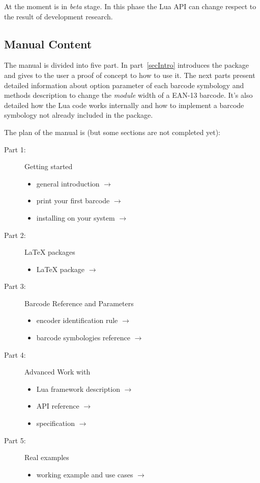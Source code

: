 \documentclass[11pt,a4paper]{article}
\begin{document}
At the moment \brcd{} is in \emph{beta} stage. In this phase the Lua API can
change respect to the result of development research.


\subsection{Manual Content}

The manual is divided into five part. In part~\ref{secIntro} introduces the
package and gives to the user a proof of concept to how to use it. The next
parts present detailed information about option parameter of each barcode
symbology and methods description to change the \emph{module} width of a EAN-13
barcode. It's also detailed how the Lua code works internally and how to
implement a barcode symbology not already included in the package.

The plan of the manual is (but some sections are not completed yet):
\begin{description}
\item[Part 1:] Getting started
\begin{itemize}
	\item general introduction \( \to \) \pageref{secIntro}
	\item print your first barcode \( \to \) \pageref{secEnter}
	\item installing \brcd{} on your system \( \to \) \pageref{secInstall}
\end{itemize}

\item[Part 2:] \LaTeX{} packages
\begin{itemize}
	\item \brcd{} \LaTeX{} package \( \to \) \pageref{secLaTeXPkg}
\end{itemize}

\item[Part 3:] Barcode Reference and Parameters
\begin{itemize}
	\item encoder identification rule \( \to \) \pageref{secEncName}
	\item barcode symbologies reference \( \to \) \pageref{secBcRef}
\end{itemize}

\item[Part 4:] Advanced Work with \brcd{}
\begin{itemize}
	\item Lua framework description \( \to \) \pageref{secFramework}
	\item API reference \( \to \) \pageref{secAPI}
	\item {} specification \( \to \) \pageref{secGA}
\end{itemize}

\item[Part 5:] Real examples
\begin{itemize}
	\item working example and use cases \( \to \) \pageref{secExample}
\end{itemize}
\end{description}
\end{document}
